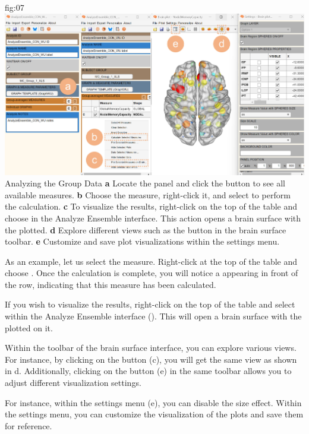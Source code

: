 \documentclass[justified]{tufte-handout}
\begin{document}
{fig:07}
{
	\includegraphics{fig07.jpg}
}
{Analyzing the Group Data}
{
	{\bf a} Locate the  panel and click the  button to see all available measures. 
	{\bf b} Choose the  measure, right-click it, and select  to perform the calculation.
	{\bf c} To visualize the results, right-click on the top of the table and choose  in the Analyze Ensemble interface. This action opens a brain surface with the  plotted.
	{\bf d} Explore different views such as the  button in the brain surface toolbar.
	{\bf e} Customize and save plot visualizations within the settings menu.
}


As an example, let us select the  measure. Right-click at the top of the table and choose . Once the calculation is complete, you will notice a  appearing in front of the  row, indicating that this measure has been calculated.

If you wish to visualize the results, right-click on the top of the table and select  within the Analyze Ensemble interface (). This will open a brain surface with the  plotted on it.

Within the toolbar of the brain surface interface, you can explore various views.
For instance, by clicking on the  button (c), you will get the same view as shown in d. Additionally, clicking on the  button (e) in the same toolbar allows you to adjust different visualization settings.

For instance, within the settings menu (e), you can disable the size effect. Within the settings menu, you can customize the visualization of the plots and save them for reference.
\end{document}

